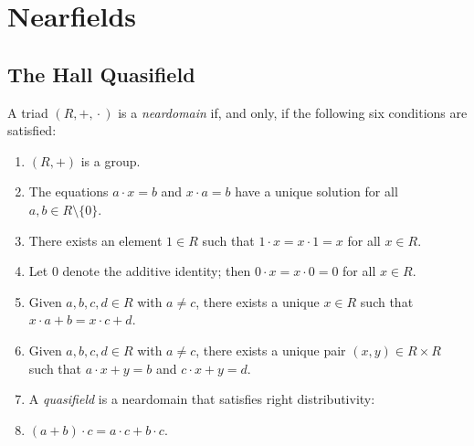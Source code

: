 \chapter{Nearfields}

\section{The Hall Quasifield}

\begin{defn}
    A triad $(R,+,{}\cdot{})$ is a \textsl{neardomain} if, and only, if the following six conditions are satisfied:
    \begin{enumerate}[label=qf\arabic*,font=\scshape]
        \item\label{QF1} $(R,+)$ is a group.
        \item\label{QF2} The equations $a\cdot x = b$ and $x\cdot a = b$ have a unique solution for all $a,b \in R \setminus \{0\}$.
        \item\label{QF3} There exists an element $1 \in R$ such that $1\cdot x = x\cdot 1 = x$ for all $x \in R$.
        \item\label{QF4} Let $0$ denote the additive identity; then $0\cdot x = x\cdot 0 = 0$ for all $x \in R$.
        \item\label{QF5} Given $a,b,c,d \in R$ with $a \ne c$, there exists a unique $x \in R$ such that $x\cdot a + b = x\cdot c + d$.
        \item\label{QF6} Given $a,b,c,d \in R$ with $a \ne c$, there exists a unique pair $(x,y) \in R \times R$ such that $a\cdot x+y = b$ and $c\cdot x + y = d$.
        \item[]A \textsl{quasifield} is a neardomain that satisfies right distributivity:
        \item\label{QF7} $(a+b)\cdot c=a\cdot c + b\cdot c$.
    \end{enumerate}
\end{defn}

